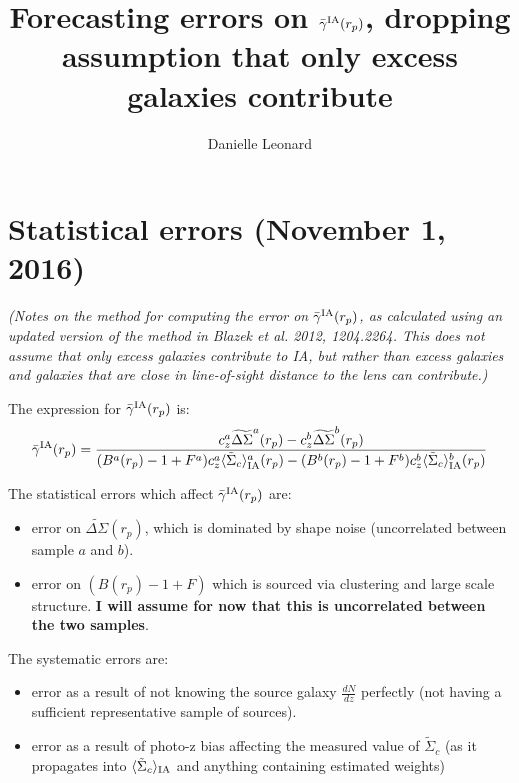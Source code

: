 \documentclass[onecolumn,amsmath,aps,fleqn, superscriptaddress]{revtex4}
\begin{document}
\title{Forecasting errors on $\bar{\gamma}^{\rm IA}(r_p)$, dropping assumption that only excess galaxies contribute}

\author{Danielle Leonard}

\maketitle

\section{Statistical errors (November 1, 2016)}

{\it (Notes on the method for computing the error on $\bar{\gamma}^{\rm IA}(r_p)$, as calculated using an updated version of the method in Blazek et al. 2012, 1204.2264. This does not assume that only excess galaxies contribute to IA, but rather than excess galaxies and galaxies that are close in line-of-sight distance to the lens can contribute.)}

The expression for $\bar{\gamma}^{\rm IA}(r_p)$ is:
\begin{equation}
\bar{\gamma}^{\rm IA}(r_p) = \frac{c_z^a \widetilde{\Delta\Sigma}^a(r_p) - c_z^b \widetilde{\Delta\Sigma}^b(r_p)}{(B^a(r_p)-1+F^a)c_z^a \langle \tilde{\Sigma}_c\rangle_{\rm IA}^a(r_p) -(B^b(r_p)-1+F^b)c_z^b \langle \tilde{\Sigma}_c\rangle_{\rm IA}^b(r_p)}
\label{gamma_sol_oct26}
\end{equation}

The statistical errors which affect $\bar{\gamma}^{\rm IA}(r_p)$ are:
\begin{itemize}
\item{error on $\widetilde{\Delta\Sigma}(r_p)$, which is dominated by shape noise (uncorrelated between sample $a$ and $b$).}
\item{error on $(B(r_p)-1+F)$ which is sourced via clustering and large scale structure. {\bf I will assume for now that this is uncorrelated between the two samples}.}
\end{itemize}

The systematic errors are:
\begin{itemize}
\item{error as a result of not knowing the source galaxy $\frac{dN}{dz}$ perfectly (not having a sufficient representative sample of sources).}
\item{error as a result of photo-z bias affecting the measured value of $\tilde{\Sigma}_c$ (as it propagates into $\langle \tilde{\Sigma}_c\rangle_{\rm IA}$ and anything containing estimated weights)}
\end{itemize}
\end{document}
